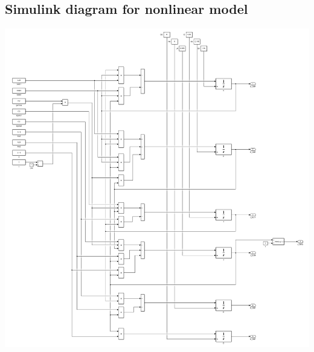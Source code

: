 \documentclass[fleqn]{article}
\begin{document}
\subsection*{Simulink diagram for nonlinear model}
\begin{center}
    \includegraphics[width=\linewidth]{simulink_diagram}
\end{center}

\newpage
\end{document}
